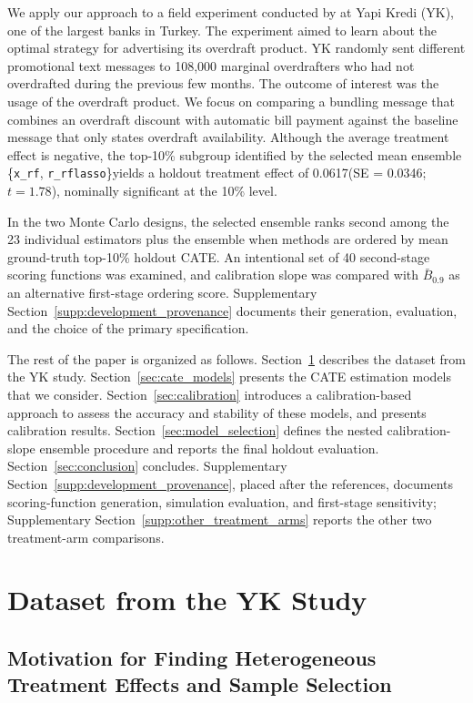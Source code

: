 \documentclass[12pt]{article}
\newcommand{\TargetFrac}{10{\%}\xspace}
\newcommand{\MainSelected}{\{\texttt{x\_rf}, \texttt{r\_rflasso}\}}
\newcommand{\MainHOATE}{0.0617}
\newcommand{\MainHOSE}{0.0346}
\newcommand{\MainHOT}{1.78}
\begin{document}
We apply our approach to a field experiment conducted by \citet{alan2018} at Yapi Kredi (YK), one of the largest banks in Turkey. The experiment aimed to learn about the optimal strategy for advertising its overdraft product. YK randomly sent different promotional text messages to 108,000 marginal overdrafters who had not overdrafted during the previous few months. The outcome of interest was the usage of the overdraft product. We focus on comparing a bundling message that combines an overdraft discount with automatic bill payment against the baseline message that only states overdraft availability. Although the average treatment effect is negative, the top-\TargetFrac subgroup identified by the selected mean ensemble \MainSelected yields a holdout treatment effect of \MainHOATE (SE = \MainHOSE; $t=\MainHOT$), nominally significant at the 10{\%} level.

In the two Monte Carlo designs, the selected ensemble ranks second among the 23 individual estimators plus the ensemble when methods are ordered by mean ground-truth top-\TargetFrac holdout CATE. An intentional set of 40 second-stage scoring functions was examined, and calibration slope was compared with $\bar B_{0.9}$ as an alternative first-stage ordering score. Supplementary Section~\ref{supp:development_provenance} documents their generation, evaluation, and the choice of the primary specification.

The rest of the paper is organized as follows. Section~\ref{sec:data} describes the dataset from the YK study. Section~\ref{sec:cate_models} presents the CATE estimation models that we consider. Section~\ref{sec:calibration} introduces a calibration-based approach to assess the accuracy and stability of these models, and presents calibration results. Section~\ref{sec:model_selection} defines the nested calibration-slope ensemble procedure and reports the final holdout evaluation. Section~\ref{sec:conclusion} concludes. Supplementary Section~\ref{supp:development_provenance}, placed after the references, documents scoring-function generation, simulation evaluation, and first-stage sensitivity; Supplementary Section~\ref{supp:other_treatment_arms} reports the other two treatment-arm comparisons.

\section{Dataset from the YK Study}
\label{sec:data}

\subsection{Motivation for Finding Heterogeneous Treatment Effects and Sample Selection}
\end{document}
